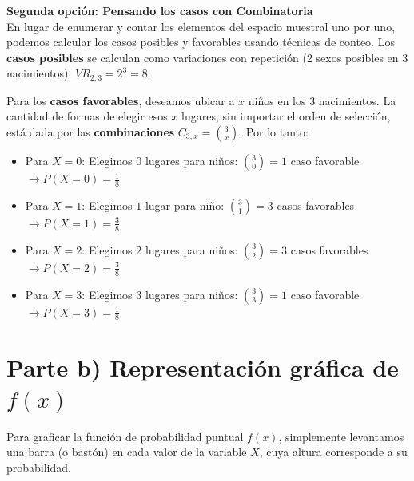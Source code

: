 \documentclass[11pt, a4paper]{article}
\begin{document}
\vspace{0.4cm}
\textbf{Segunda opción: Pensando los casos con Combinatoria} \\
En lugar de enumerar y contar los elementos del espacio muestral uno por uno, podemos calcular los casos posibles y favorables usando técnicas de conteo. Los \textbf{casos posibles} se calculan como variaciones con repetición (2 sexos posibles en 3 nacimientos): $VR_{2,3} = 2^3 = 8$.

Para los \textbf{casos favorables}, deseamos ubicar a $x$ niños en los 3 nacimientos. La cantidad de formas de elegir esos $x$ lugares, sin importar el orden de selección, está dada por las \textbf{combinaciones} $C_{3,x} = \binom{3}{x}$. Por lo tanto:
\begin{itemize}
    \item Para $X=0$: Elegimos $0$ lugares para niños: $\binom{3}{0} = 1$ caso favorable $\rightarrow P(X=0) = \frac{1}{8}$
    \item Para $X=1$: Elegimos $1$ lugar para niño: $\binom{3}{1} = 3$ casos favorables $\rightarrow P(X=1) = \frac{3}{8}$
    \item Para $X=2$: Elegimos $2$ lugares para niños: $\binom{3}{2} = 3$ casos favorables $\rightarrow P(X=2) = \frac{3}{8}$
    \item Para $X=3$: Elegimos $3$ lugares para niños: $\binom{3}{3} = 1$ caso favorable $\rightarrow P(X=3) = \frac{1}{8}$
\end{itemize}

\vspace{0.5cm}

\section*{Parte b) Representación gráfica de $f(x)$}

Para graficar la función de probabilidad puntual $f(x)$, simplemente levantamos una barra (o bastón) en cada valor de la variable $X$, cuya altura corresponde a su probabilidad.

\begin{center}
\end{center}
\end{document}
